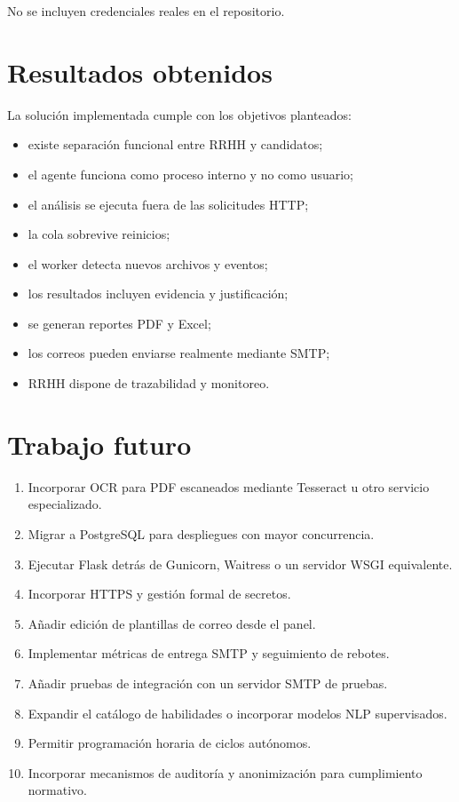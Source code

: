 \documentclass[12pt,a4paper]{article}
\begin{document}
No se incluyen credenciales reales en el repositorio.

\section{Resultados obtenidos}

La solución implementada cumple con los objetivos planteados:

\begin{itemize}[leftmargin=*]
    \item existe separación funcional entre RRHH y candidatos;
    \item el agente funciona como proceso interno y no como usuario;
    \item el análisis se ejecuta fuera de las solicitudes HTTP;
    \item la cola sobrevive reinicios;
    \item el worker detecta nuevos archivos y eventos;
    \item los resultados incluyen evidencia y justificación;
    \item se generan reportes PDF y Excel;
    \item los correos pueden enviarse realmente mediante SMTP;
    \item RRHH dispone de trazabilidad y monitoreo.
\end{itemize}

\section{Trabajo futuro}

\begin{enumerate}[leftmargin=*]
    \item Incorporar OCR para PDF escaneados mediante Tesseract u otro servicio especializado.
    \item Migrar a PostgreSQL para despliegues con mayor concurrencia.
    \item Ejecutar Flask detrás de Gunicorn, Waitress o un servidor WSGI equivalente.
    \item Incorporar HTTPS y gestión formal de secretos.
    \item Añadir edición de plantillas de correo desde el panel.
    \item Implementar métricas de entrega SMTP y seguimiento de rebotes.
    \item Añadir pruebas de integración con un servidor SMTP de pruebas.
    \item Expandir el catálogo de habilidades o incorporar modelos NLP supervisados.
    \item Permitir programación horaria de ciclos autónomos.
    \item Incorporar mecanismos de auditoría y anonimización para cumplimiento normativo.
\end{enumerate}
\end{document}
